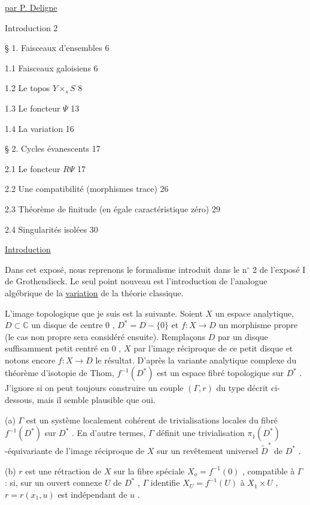 \underline{par  P. Deligne}

Introduction \hfill 2

\S{} 1.  Faisceaux d'ensembles \hfill 6

1.1  Faisceaux galoisiens \hfill 6

1.2  Le topos $Y \times_s S$ \hfill 8

1.3  Le foncteur $\Psi$ \hfill 13

1.4  La variation \hfill 16

\S{} 2.  Cycles évanescents \hfill 17

2.1  Le foncteur $R\Psi$ \hfill 17

2.2  Une compatibilité (morphismes trace) \hfill 26

2.3  Théorème de finitude (en égale caractéristique zéro) \hfill 29

2.4  Singularités isolées \hfill 30




\underline{Introduction}

Dans cet exposé, nous reprenons le formalisme introduit dans le n$^\circ$ 2 de l'exposé I de Grothendieck. Le seul point nouveau est l'introduction de l'analogue algébrique de la \underline{variation} de la théorie classique.

L'image topologique que je suis est la suivante. Soient $X$ un espace analytique, $D \subset \mathbb{C}$ un disque de centre $0$ , $D^* = D - \{0\}$ et $f : X \to D$ un morphisme propre (le cas non propre sera considéré ensuite). Remplaçons $D$ par un disque suffisamment petit centré en $0$ , $X$ par l'image réciproque de ce petit disque et notons encore $f : X \to D$ le résultat. D'après la variante analytique complexe du théorème d'isotopie de Thom, $f^{-1}(D^*)$ est un espace fibré topologique sur $D^*$ . J'ignore si on peut toujours construire un couple $(\Gamma, r)$ du type décrit ci-dessous, mais il semble plausible que oui.

(a) $\Gamma$ est un système localement cohérent de trivialisations locales du fibré $f^{-1}(D^*)$ sur $D^*$ . En d'autre termes, $\Gamma$ définit une trivialisation $\pi_1(D^*)$-équivariante de l'image réciproque de $X$ sur un revêtement universel $\widetilde{D}^*$ de $D^*$ .

(b) $r$ est une rétraction de $X$ sur la fibre spéciale $X_o = f^{-1}(0)$ , compatible à $\Gamma$ : si, sur un ouvert connexe $U$ de $D^*$ , $\Gamma$ identifie $X_U = f^{-1}(U)$ à $X_1 \times U$ , $r = r(x_1, u)$ est indépendant de $u$ .

